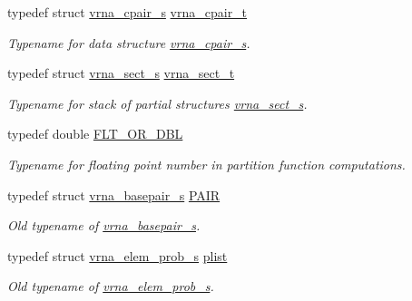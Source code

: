 \begin{DoxyCompactItemize}
typedef struct \hyperlink{group__data__structures_structvrna__cpair__s}{vrna\+\_\+cpair\+\_\+s} \hyperlink{group__data__structures_gae4fc91141cc69c6d8eaf1332cb991ecc}{vrna\+\_\+cpair\+\_\+t}
\begin{DoxyCompactList}\small\item\em Typename for data structure \hyperlink{group__data__structures_structvrna__cpair__s}{vrna\+\_\+cpair\+\_\+s}. \end{DoxyCompactList}\item 
\mbox{\label{group__data__structures_gacc9cdae790dac75a7024e7069c0d4400}} 
typedef struct \hyperlink{group__data__structures_structvrna__sect__s}{vrna\+\_\+sect\+\_\+s} \hyperlink{group__data__structures_gacc9cdae790dac75a7024e7069c0d4400}{vrna\+\_\+sect\+\_\+t}
\begin{DoxyCompactList}\small\item\em Typename for stack of partial structures \hyperlink{group__data__structures_structvrna__sect__s}{vrna\+\_\+sect\+\_\+s}. \end{DoxyCompactList}\item 
\mbox{\label{group__data__structures_ga31125aeace516926bf7f251f759b6126}} 
typedef double \hyperlink{group__data__structures_ga31125aeace516926bf7f251f759b6126}{F\+L\+T\+\_\+\+O\+R\+\_\+\+D\+BL}
\begin{DoxyCompactList}\small\item\em Typename for floating point number in partition function computations. \end{DoxyCompactList}\item 
typedef struct \hyperlink{group__data__structures_structvrna__basepair__s}{vrna\+\_\+basepair\+\_\+s} \hyperlink{group__data__structures_ga4381025ffbd692e54189b2c679c79c99}{P\+A\+IR}
\begin{DoxyCompactList}\small\item\em Old typename of \hyperlink{group__data__structures_structvrna__basepair__s}{vrna\+\_\+basepair\+\_\+s}. \end{DoxyCompactList}\item 
typedef struct \hyperlink{group__struct__utils_structvrna__elem__prob__s}{vrna\+\_\+elem\+\_\+prob\+\_\+s} \hyperlink{group__data__structures_ga9608eed021ebfbdd7a901cfdc446c8e9}{plist}
\begin{DoxyCompactList}\small\item\em Old typename of \hyperlink{group__struct__utils_structvrna__elem__prob__s}{vrna\+\_\+elem\+\_\+prob\+\_\+s}. \end{DoxyCompactList}\item 

\end{DoxyCompactItemize}
